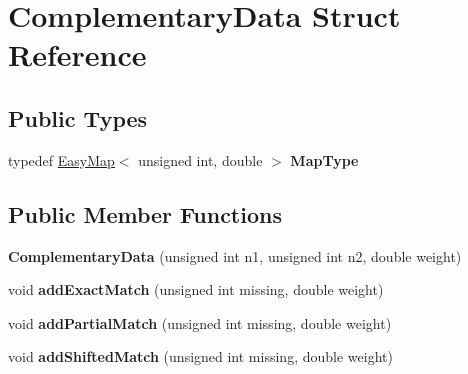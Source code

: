 \hypertarget{structComplementaryData}{}\section{Complementary\+Data Struct Reference}
\label{structComplementaryData}
\subsection*{Public Types}
\begin{DoxyCompactItemize}
\item 
\mbox{\label{structComplementaryData_a34adbe22ce8195274cfe2b6d4a7d82b7}} 
typedef \mbox{\hyperlink{classEasyMap}{Easy\+Map}}$<$ unsigned int, double $>$ {\bfseries Map\+Type}
\end{DoxyCompactItemize}
\subsection*{Public Member Functions}
\begin{DoxyCompactItemize}
\item 
\mbox{\label{structComplementaryData_ae36d70f8f852e1db557b259475680018}} 
{\bfseries Complementary\+Data} (unsigned int n1, unsigned int n2, double weight)
\item 
\mbox{\label{structComplementaryData_ab88c7314d82412d0f3cae4c34b8065f7}} 
void {\bfseries add\+Exact\+Match} (unsigned int missing, double weight)
\item 
\mbox{\label{structComplementaryData_aca80acc89ab4c0b83a6dbbda6e650366}} 
void {\bfseries add\+Partial\+Match} (unsigned int missing, double weight)
\item 
\mbox{\label{structComplementaryData_ad400a84c0ed5c56d6a21de749e69d8f1}} 
void {\bfseries add\+Shifted\+Match} (unsigned int missing, double weight)
\end{DoxyCompactItemize}
